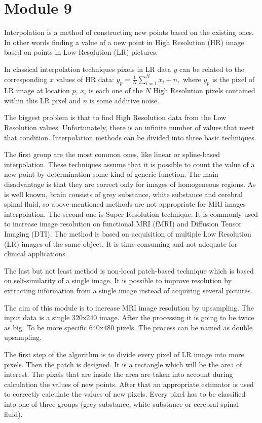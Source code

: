 \section{Module 9}

Interpolation is a method of constructing new points based on the
existing ones. In other words finding a value of a new point in High
Resolution (HR) image based on points in Low Resolution (LR) pictures.

In classical interpolation techniques pixels in LR data $y$ can be
related to the corresponding $x$ values of HR data: $y_{p}=\frac{1}{N}\sum_{i=1}^{N}x_{i}+n,$
where $y_{p}$ is the pixel of LR image at location $p$, $x_{i}$
is each one of the $N$ High Resolution pixels contained within this
LR pixel and $n$ is some additive noise.

The biggest problem is that to find High Resolution data from the
Low Resolution values. Unfortunately, there is an infinite number
of values that meet that condition. Interpolation methods can be divided
into three basic techniques.

The first group are the most common ones, like linear or spline-based
interpolation. These techniques assume that it is possible to count
the value of a new point by determination some kind of generic function.
The main disadvantage is that they are correct only for images of
homogeneous regions. As is well known, brain consists of grey substance,
white substance and cerebral spinal fluid, so above-mentioned methods
are not appropriate for MRI images interpolation. The second one is
Super Resolution technique. It is commonly used to increase image
resolution on functional MRI (fMRI) and Diffusion Tensor Imaging (DTI).
The method is based on acquisition of multiple Low Resolution (LR)
images of the same object. It is time consuming and not adequate for
clinical applications.

The last but not least method is non-local patch-based technique which
is based on self-similarity of a single image. It is possible to improve
resolution by extracting information from a single image instead of
acquiring several pictures.

The aim of this module is to increase MRI image resolution by upsampling.
The input data is a single 320x240 image. After the processing it
is going to be twice as big. To be more specific 640x480 pixels. The
process can be named as double upsampling.

The first step of the algorithm is to divide every pixel of LR image
into more pixels. Then the patch is designed. It is a rectangle which
will be the area of interest. The pixels that are inside the area
are taken into account during calculation the values of new points.
After that an appropriate estimator is used to correctly calculate
the values of new pixels. Every pixel has to be classified into one
of three groups (grey substance, white substance or cerebral spinal
fluid).
